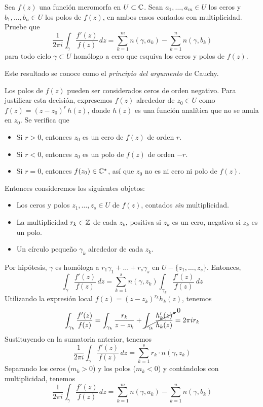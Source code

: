 \begin{exercise}
Sea $f(z)$ una función meromorfa en $U \subset \mathbb C$. Sean $a_1, \dots, a_m \in U$ los ceros y $b_1, \dots, b_n \in U$ los polos de $f(z)$, en ambos casos contados con multiplicidad. Pruebe que
$$
\frac 1 {2\pi i} \int_\gamma \frac {f'(z)} {f(z)} \, dz
    = \sum_{k=1}^m n(\gamma, a_k) - \sum_{k=1}^n n(\gamma, b_k)
$$
para todo ciclo $\gamma \subset U$ homólogo a cero que esquiva los ceros y polos de $f(z)$.
\end{exercise}

\begin{remark}
Este resultado se conoce como el \textit{principio del argumento} de Cauchy.
\end{remark}

\begin{solution}
Los polos de $f(z)$ pueden ser considerados ceros de orden negativo. Para justificar esta decisión, expresemos $f(z)$ alrededor de $z_0 \in U$ como $f(z) = (z - z_0)^r \, h(z)$, donde $h(z)$ es una función analítica que no se anula en $z_0$. Se verifica que
\begin{itemize}
    \item Si $r > 0$, entonces $z_0$ es un cero de $f(z)$ de orden $r$.
    \item Si $r < 0$, entonces $z_0$ es un polo de $f(z)$ de orden $-r$.
    \item Si $r = 0$, entonces $f(z_0) \in \mathbb C^\star$, así que $z_0$ no es ni cero ni polo de $f(z)$.
\end{itemize}
Entonces consideremos los siguientes objetos:
\begin{itemize}
    \item Los ceros y polos $z_1, \dots, z_s \in U$ de $f(z)$, contados \textit{sin} multiplicidad.
    \item La multiplicidad $r_k \in \mathbb Z$ de cada $z_k$, positiva si $z_k$ es un cero, negativa si $z_k$ es un polo.
    \item Un círculo pequeño $\gamma_k$ alrededor de cada $z_k$.
\end{itemize}
Por hipótesis, $\gamma$ es homóloga a $r_1 \gamma_1 + \dots + r_s \gamma_s$ en $U - \{ z_1, \dots, z_s \}$. Entonces,
$$
\int_\gamma \frac {f'(z)} {f(z)} \, dz
    = \sum_{k=1}^s n(\gamma, z_k) \int_{\gamma_k} \frac {f'(z)} {f(z)} \, dz
$$
Utilizando la expresión local $f(z) = (z - z_k)^{r_k} h_k(z)$, tenemos
$$
\int_{\gamma_k} \frac {f'(z)} {f(z)}
    = \int_{\gamma_k} \frac {r_k} {z - z_k}
    + \cancelto 0 {\int_{\gamma_k} \frac {h_k'(z)} {h_k(z)}}
    = 2\pi ir_k
$$
Sustituyendo en la sumatoria anterior, tenemos
$$\frac 1 {2\pi i} \int_\gamma \frac {f'(z)} {f(z)} \, dz = \sum_{k=1}^s r_k \cdot n(\gamma, z_k)$$
Separando los ceros ($m_k > 0$) y los polos ($m_k < 0$) y contándolos con multiplicidad, tenemos
$$
\frac 1 {2\pi i} \int_\gamma \frac {f'(z)} {f(z)} \, dz
    = \sum_{k=1}^m n(\gamma, a_k) - \sum_{k=1}^n n(\gamma, b_k)
$$
\end{solution}
